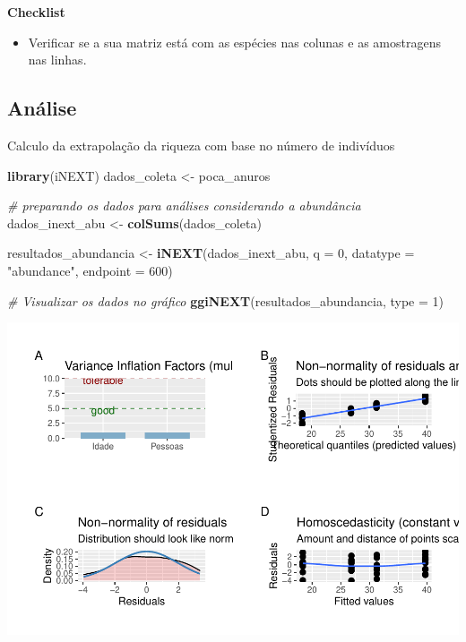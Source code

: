 \documentclass[
]{book}
\newenvironment{Shaded}{\begin{snugshade}}{\end{snugshade}}
\newcommand{\CommentTok}[1]{\textcolor[rgb]{0.56,0.35,0.01}{\textit{#1}}}
\newcommand{\DataTypeTok}[1]{\textcolor[rgb]{0.13,0.29,0.53}{#1}}
\newcommand{\DecValTok}[1]{\textcolor[rgb]{0.00,0.00,0.81}{#1}}
\newcommand{\KeywordTok}[1]{\textcolor[rgb]{0.13,0.29,0.53}{\textbf{#1}}}
\newcommand{\NormalTok}[1]{#1}
\newcommand{\StringTok}[1]{\textcolor[rgb]{0.31,0.60,0.02}{#1}}
\providecommand{\tightlist}{%
  \setlength{\itemsep}{0pt}\setlength{\parskip}{0pt}}
\begin{document}
\textbf{Checklist}

\begin{itemize}
\tightlist
\item
  Verificar se a sua matriz está com as espécies nas colunas e as amostragens nas linhas.
\end{itemize}

\hypertarget{anuxe1lise-8}{%
\subsection{Análise}\label{anuxe1lise-8}}

Calculo da extrapolação da riqueza com base no número de indivíduos

\begin{Shaded}
\begin{Highlighting}[]
\KeywordTok{library}\NormalTok{(iNEXT)}
\NormalTok{dados_coleta <-}\StringTok{ }\NormalTok{poca_anuros}

\CommentTok{# preparando os dados para análises considerando a abundância}
\NormalTok{dados_inext_abu <-}\StringTok{ }\KeywordTok{colSums}\NormalTok{(dados_coleta) }

\NormalTok{resultados_abundancia <-}\StringTok{ }\KeywordTok{iNEXT}\NormalTok{(dados_inext_abu, }\DataTypeTok{q =} \DecValTok{0}\NormalTok{, }\DataTypeTok{datatype =} \StringTok{"abundance"}\NormalTok{, }
            \DataTypeTok{endpoint =} \DecValTok{600}\NormalTok{)}

\CommentTok{# Visualizar os dados no gráfico}
\KeywordTok{ggiNEXT}\NormalTok{(resultados_abundancia, }\DataTypeTok{type =} \DecValTok{1}\NormalTok{)}
\end{Highlighting}
\end{Shaded}

\includegraphics{livro_r_ecologia_files/figure-latex/unnamed-chunk-16-1.pdf}
\end{document}
